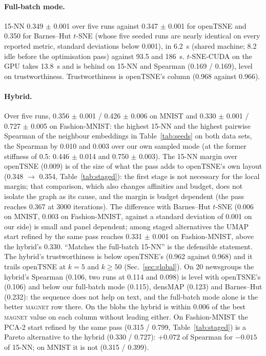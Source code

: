 \documentclass[11pt]{article}
\newcommand{\magnet}{\textsc{magnet}}
\begin{document}
\paragraph{Full-batch mode.} 15-NN 0.349 $\pm$ 0.001 over five runs against 0.347 $\pm$ 0.001 for
openTSNE and 0.350 for Barnes--Hut $t$-SNE (whose five seeded runs are nearly identical on every
reported metric, standard deviations below 0.001), in 6.2~s (shared machine; 8.2 idle before the
optimisation pass) against 93.5 and 186~s. $t$-SNE-CUDA on the GPU takes 13.8~s and is behind on 15-NN and Spearman (0.169
/ 0.169), level on trustworthiness. Trustworthiness is openTSNE's column (0.968 against 0.966).

\paragraph{Hybrid.} Over five runs, 0.356 $\pm$ 0.001 / 0.426 $\pm$ 0.006 on MNIST and 0.330 $\pm$ 0.001
/ 0.727 $\pm$ 0.005 on Fashion-MNIST: the highest 15-NN and the highest pairwise Spearman of the
neighbour embeddings in Table~\ref{tab:seeds} on both data sets, the Spearman by 0.010 and 0.003 over our own
sampled mode (at the former stiffness of 0.5: 0.446 $\pm$ 0.014 and 0.750 $\pm$ 0.003). The 15-NN margin over openTSNE
(0.009) is of the size of what the pass adds to openTSNE's own layout (0.348 $\to$ 0.354,
Table~\ref{tab:staged}): the first stage is not necessary for the local margin; that comparison,
which also changes affinities and budget, does not isolate the graph as its cause, and the margin is
budget dependent (the pass reaches 0.367 at 3000 iterations). The difference with Barnes--Hut $t$-SNE (0.006 on MNIST, 0.003 on Fashion-MNIST, against a standard
deviation of 0.001 on our side) is small and panel dependent; among staged alternatives the UMAP start
refined by the same pass reaches 0.331 $\pm$ 0.001 on Fashion-MNIST, above the hybrid's 0.330. ``Matches
the full-batch 15-NN'' is the defensible statement. The hybrid's trustworthiness is below openTSNE's
(0.962 against 0.968) and it trails openTSNE at $k = 5$ and $k \ge 50$ (Sec.~\ref{sec:global}). On 20
newsgroups the hybrid's Spearman (0.106, two runs at 0.114 and 0.098) is level with openTSNE's (0.106) and below our
full-batch mode (0.115), densMAP (0.123) and Barnes--Hut (0.232): the sequence does not help on text,
and the full-batch mode alone is the better \magnet{} row there. On the blobs the hybrid is within
0.006 of the best \magnet{} value on each column without leading either. On Fashion-MNIST the PCA-2
start refined by the same pass (0.315 / 0.799, Table~\ref{tab:staged}) is a Pareto alternative to the
hybrid (0.330 / 0.727): $+0.072$ of Spearman for $-0.015$ of 15-NN; on MNIST it is not (0.315 / 0.399).
\end{document}
